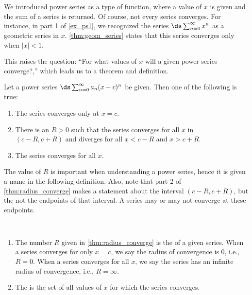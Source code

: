 We introduced power series as a type of function, where a value of $x$ is given and the sum of a series is returned. Of course, not every series converges. For instance, in part 1 of \autoref{ex_ps1}, we recognized the series $\ds \sum_{n=0}^\infty x^n$ as a geometric series in $x$. \autoref{thm:geom_series} states that this series converges only when $|x|<1$. 

This raises the question: ``For what values of $x$ will a given power series converge?,'' which  leads us to a theorem and definition.

{Let a power series $\ds \sum_{n=0}^\infty a_n(x-c)^n$ be given. Then one of the following is true:
\begin{enumerate}
	\item The series converges only at $x=c$.
	\item	There is an $R>0$ such that the series converges for all $x$ in \\	
	$(c-R,c+R)$ and diverges for all $x<c-R$ and $x>c+R$.
	\item	The series converges for all $x$.
\end{enumerate}
}

	
The value of $R$ is important when understanding a power series, hence it is given a name in the following definition. Also, note that part 2 of \autoref{thm:radius_converge} makes a statement about the interval $(c-R,c+R)$, but the not the endpoints of that interval. A series may or may not converge at these endpoints.
	
{\mbox{}\\[-2\baselineskip]\begin{enumerate}
	\item The number $R$ given in \autoref{thm:radius_converge} is the  of a given series. When a series converges for only $x=c$, we say the radius of convergence is 0, i.e.,  $R=0$. When a series converges for all $x$, we say the series has an infinite radius of convergence, i.e., $R=\infty$.
	\item	The  is the set of all values of $x$ for which the series converges.
\end{enumerate}}

